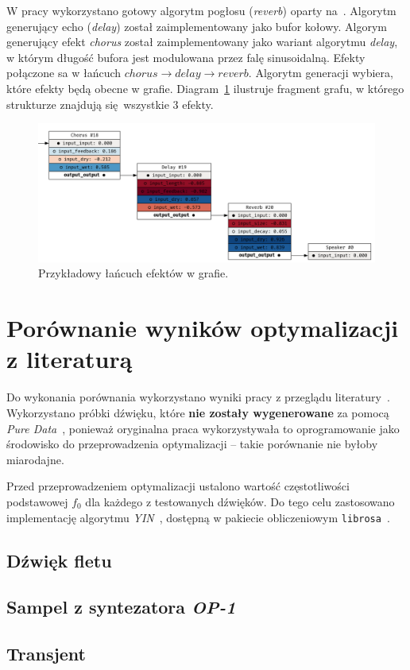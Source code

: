 W pracy wykorzystano gotowy algorytm pogłosu (\textit{reverb}) oparty na~\cite{reverb}.
Algorytm generujący echo (\textit{delay}) został zaimplementowany jako bufor kołowy.
Algorym generujący efekt \textit{chorus} został zaimplementowany jako wariant algorytmu \textit{delay},
w którym długość bufora jest modulowana przez falę sinusoidalną. Efekty połączone sa w łańcuch
$chorus \rightarrow delay \rightarrow reverb$. Algorytm generacji wybiera, które efekty będą obecne w grafie.
Diagram~\ref{fig:example_generated_effects} ilustruje fragment grafu,
w którego strukturze znajdują się wszystkie 3 efekty.

\begin{figure}[H]
    \centering
    \includegraphics[width=1.0\linewidth]{rys06/example_generated_effects.png}
    \caption{
      Przykładowy łańcuch efektów w grafie.
    }\label{fig:example_generated_effects}
\end{figure}

\section{Porównanie wyników optymalizacji z literaturą~\cite{evolutionary_puredata}}

Do wykonania porównania wykorzystano wyniki pracy z przeglądu
literatury~\cite{evolutionary_puredata_results}. Wykorzystano próbki dźwięku,
które \textbf{nie zostały wygenerowane} za pomocą
\textit{Pure Data}~\cite{pure_data}, ponieważ oryginalna praca wykorzystywała
to oprogramowanie jako środowisko do przeprowadzenia optymalizacji -- takie porównanie
nie byłoby miarodajne.

Przed przeprowadzeniem optymalizacji ustalono wartość częstotliwości podstawowej $f_0$
dla każdego z testowanych dźwięków. Do tego celu zastosowano implementację algorytmu
\textit{YIN}~\cite{yin_pitch_estimation}, dostępną w pakiecie obliczeniowym
\texttt{librosa}~\cite{librosa}.

\subsection{Dźwięk fletu}

\subsection{Sampel z syntezatora \textit{OP-1}}

\subsection{Transjent}
